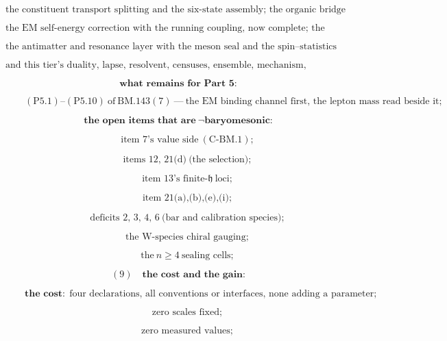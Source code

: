 \documentclass[11pt,openany]{report}
\theoremstyle{canonplain}
\theoremstyle{canondef}
\begin{document}
\[
\text{the constituent transport splitting and the six-state assembly; the organic bridge with its priced residue; the chiral assignment issued; the mass-ratio census in four incommensurable currencies;}
\]

\[
\text{the EM self-energy correction with the running coupling, now complete; the flicker integral and the rest-mass Q-value; the six objective resolutions with the curvature composition, now selected;}
\]

\[
\text{the antimatter and resonance layer with the meson seal and the spin--statistics closure; the annihilation channel, the concrete spin and the fermion identification;}
\]

\[
\text{and this tier's duality, lapse, resolvent, censuses, ensemble, mechanism, declarations, ceilings, residue, amplitude and cleaning;}
\]

\[
\textbf{what remains for Part 5:}
\]

\[
\qquad (\mathrm{P5.1})\text{--}(\mathrm{P5.10})\ \text{of}\ \mathrm{BM.143}(7)\ —\ \text{the EM binding channel first, the lepton mass read beside it};
\]

\[
\textbf{the open items that are}\ \neg\textbf{baryomesonic:}
\]

\[
\qquad \text{item 7's value side}\ (\mathrm{C\text{-}BM.1});
\]

\[
\qquad \text{items 12, 21(d)}\ \text{(the selection)};
\]

\[
\qquad \text{item 13's finite-}\mathfrak h\ \text{loci};
\]

\[
\qquad \text{item 21(a),(b),(e),(i)};
\]

\[
\qquad \text{deficits 2, 3, 4, 6}\ \text{(bar and calibration species)};
\]

\[
\qquad \text{the W-species chiral gauging};
\]

\[
\qquad \text{the}\ n\ge4\ \text{sealing cells};
\]

\[
(9)\quad\textbf{the cost and the gain:}
\]

\[
\qquad \textbf{the cost:}\ \ \text{four declarations, all conventions or interfaces, none adding a parameter};
\]

\[
\qquad \text{zero scales fixed};
\]

\[
\qquad \text{zero measured values};
\]
\end{document}
